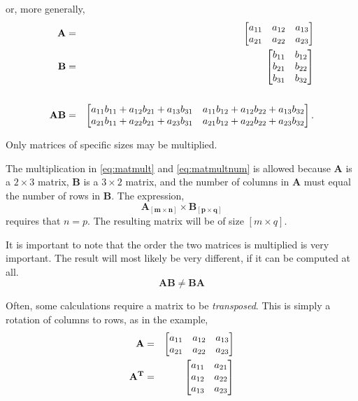or, more generally,
\begin{eqnarray}
	\label{eq:matmultnum}
\mathbf{A} &=& \notag
	\begin{bmatrix}
	a_{11} & a_{12} & a_{13} \\
	a_{21} & a_{22} & a_{23} \\
	\end{bmatrix} \\
\mathbf{B}&=&  \notag
	\begin{bmatrix}
	b_{11} & b_{12} \\
	b_{21} & b_{22} \\
	b_{31} & b_{32} \\
	\end{bmatrix} \\
\\ \notag
\mathbf{A} \mathbf{B}&=&
	\begin{bmatrix}
	a_{11} b_{11} + a_{12} b_{21} + a_{13} b_{31} & a_{11} b_{12} + a_{12} b_{22} + a_{13} b_{32} \\
	a_{21} b_{11} + a_{22} b_{21} + a_{23} b_{31} & a_{21} b_{12} + a_{22} b_{22} + a_{23} b_{32} \\
	\end{bmatrix}.
\end{eqnarray}

Only matrices of specific sizes may be multiplied.

The multiplication in \eqref{eq:matmult} and \eqref{eq:matmultnum} is allowed because $\mathbf{A}$ is a $2 \times 3$ matrix, $\mathbf{B}$ is a $3 \times 2$ matrix, and the number of columns in $\mathbf{A}$ must equal the number of rows in $\mathbf{B}$. The expression,
\[
\mathbf{A_{[m \times n]}} \times \mathbf{B_{[p \times q]}}
\]
requires that $n=p$. The resulting matrix will be of size $[m \times q]$.

It is important to note that the order the two matrices is multiplied is very important. The result will most likely be very different, if it can be computed at all.
\[
\mathbf{AB} \neq \mathbf{BA}
\]

Often, some calculations require a matrix to be \emph{transposed}. This is simply a rotation of columns to rows, as in the example,
\begin{eqnarray}
\mathbf{A} &=& \notag
	\begin{bmatrix}
	a_{11} & a_{12} & a_{13} \\
	a_{21} & a_{22} & a_{23} \\
	\end{bmatrix} \\
\mathbf{A^{T}} &=& \notag
	\begin{bmatrix}
	a_{11} & a_{21} \\
	a_{12} & a_{22} \\
	a_{13} & a_{23} \\
	\end{bmatrix}
\end{eqnarray}


